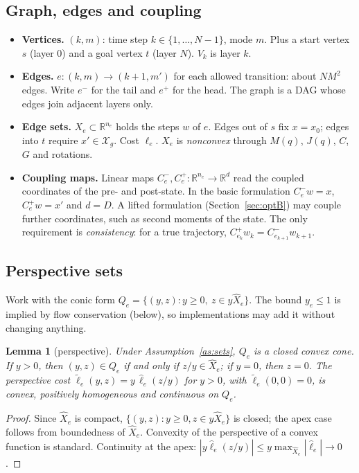\documentclass[11pt]{article}
\newcommand{\R}{\mathbb{R}}
\theoremstyle{plain}
\newtheorem{lemma}[theorem]{Lemma}
\theoremstyle{definition}
\theoremstyle{remark}
\begin{document}
\subsection{Graph, edges and coupling}
\begin{itemize}[leftmargin=1.2em]
  \item \textbf{Vertices.} $(k,m)$: time step $k\in\{1,\dots,N-1\}$, mode $m$. Plus a start vertex $s$ (layer $0$) and a goal vertex $t$ (layer $N$). $V_k$ is layer $k$.
  \item \textbf{Edges.} $e:(k,m)\to(k+1,m')$ for each allowed transition: about $NM^2$ edges. Write $e^-$ for the tail and $e^+$ for the head. The graph is a DAG whose edges join adjacent layers only.
  \item \textbf{Edge sets.} $X_e\subset\R^{n_e}$ holds the steps $w$ of $e$. Edges out of $s$ fix $x=x_0$; edges into $t$ require $x'\in\mathcal X_g$. Cost $\ell_e$. $X_e$ is \emph{nonconvex} through $M(q)$, $J(q)$, $C$, $G$ and rotations.
  \item \textbf{Coupling maps.} Linear maps $C_e^-,C_e^+:\R^{n_e}\to\R^{d}$ read the coupled coordinates of the pre- and post-state. In the basic formulation $C_e^-w=x$, $C_e^+w=x'$ and $d=D$. A lifted formulation (Section~\ref{sec:optB}) may couple further coordinates, such as second moments of the state. The only requirement is \emph{consistency}: for a true trajectory, $C^+_{e_k}w_k=C^-_{e_{k+1}}w_{k+1}$.
\end{itemize}

\subsection{Perspective sets}
Work with the conic form $Q_e=\{(y,z): y\ge0,\ z\in y\hat X_e\}$. The bound $y_e\le1$ is implied by flow conservation (below), so implementations may add it without changing anything.

\begin{lemma}[perspective]\label{lem:persp}
Under Assumption~\ref{as:sets}, $Q_e$ is a closed convex cone. If $y>0$, then $(y,z)\in Q_e$ if and only if $z/y\in\hat X_e$; if $y=0$, then $z=0$. The perspective cost $\tilde\ell_e(y,z)=y\,\hat\ell_e(z/y)$ for $y>0$, with $\tilde\ell_e(0,0)=0$, is convex, positively homogeneous and continuous on $Q_e$.
\end{lemma}
\begin{proof}
Since $\hat X_e$ is compact, $\{(y,z):y\ge0,z\in y\hat X_e\}$ is closed; the apex case follows from boundedness of $\hat X_e$. Convexity of the perspective of a convex function is standard. Continuity at the apex: $|y\hat\ell_e(z/y)|\le y\max_{\hat X_e}|\hat\ell_e|\to0$.
\end{proof}
\end{document}
